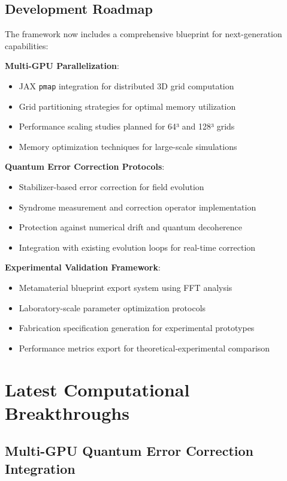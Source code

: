\documentclass[11pt]{article}
\begin{document}
\subsection{Development Roadmap}

The framework now includes a comprehensive blueprint for next-generation capabilities:

\textbf{Multi-GPU Parallelization}:
\begin{itemize}
\item JAX \texttt{pmap} integration for distributed 3D grid computation
\item Grid partitioning strategies for optimal memory utilization
\item Performance scaling studies planned for 64³ and 128³ grids
\item Memory optimization techniques for large-scale simulations
\end{itemize}

\textbf{Quantum Error Correction Protocols}:
\begin{itemize}
\item Stabilizer-based error correction for field evolution
\item Syndrome measurement and correction operator implementation
\item Protection against numerical drift and quantum decoherence
\item Integration with existing evolution loops for real-time correction
\end{itemize}

\textbf{Experimental Validation Framework}:
\begin{itemize}
\item Metamaterial blueprint export system using FFT analysis
\item Laboratory-scale parameter optimization protocols
\item Fabrication specification generation for experimental prototypes
\item Performance metrics export for theoretical-experimental comparison
\end{itemize}

\section{Latest Computational Breakthroughs}

\subsection{Multi-GPU Quantum Error Correction Integration}
\end{document}
